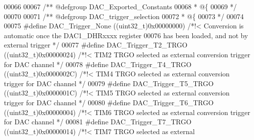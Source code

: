 \begin{DoxyCode}
00066 
00067 \textcolor{comment}{/** @defgroup DAC\_Exported\_Constants}
00068 \textcolor{comment}{  * @\{}
00069 \textcolor{comment}{  */}
00070 
00071 \textcolor{comment}{/** @defgroup DAC\_trigger\_selection }
00072 \textcolor{comment}{  * @\{}
00073 \textcolor{comment}{  */}
00074 
00075 \textcolor{preprocessor}{#}\textcolor{preprocessor}{define} \textcolor{preprocessor}{DAC\_Trigger\_None}                   \textcolor{preprocessor}{(}\textcolor{preprocessor}{(}\textcolor{preprocessor}{uint32\_t}\textcolor{preprocessor}{)}0x00000000\textcolor{preprocessor}{)} \textcolor{comment}{/*!< Conversion is automatic once
       the DAC1\_DHRxxxx register }
00076 \textcolor{comment}{                                                                       has been loaded, and not by
       external trigger */}
00077 \textcolor{preprocessor}{#}\textcolor{preprocessor}{define} \textcolor{preprocessor}{DAC\_Trigger\_T2\_TRGO}                \textcolor{preprocessor}{(}\textcolor{preprocessor}{(}\textcolor{preprocessor}{uint32\_t}\textcolor{preprocessor}{)}0x00000024\textcolor{preprocessor}{)} \textcolor{comment}{/*!< TIM2 TRGO selected as external
       conversion trigger for DAC channel */}
00078 \textcolor{preprocessor}{#}\textcolor{preprocessor}{define} \textcolor{preprocessor}{DAC\_Trigger\_T4\_TRGO}                \textcolor{preprocessor}{(}\textcolor{preprocessor}{(}\textcolor{preprocessor}{uint32\_t}\textcolor{preprocessor}{)}0x0000002C\textcolor{preprocessor}{)} \textcolor{comment}{/*!< TIM4 TRGO selected as external
       conversion trigger for DAC channel */}
00079 \textcolor{preprocessor}{#}\textcolor{preprocessor}{define} \textcolor{preprocessor}{DAC\_Trigger\_T5\_TRGO}                \textcolor{preprocessor}{(}\textcolor{preprocessor}{(}\textcolor{preprocessor}{uint32\_t}\textcolor{preprocessor}{)}0x0000001C\textcolor{preprocessor}{)} \textcolor{comment}{/*!< TIM5 TRGO selected as external
       conversion trigger for DAC channel */}
00080 \textcolor{preprocessor}{#}\textcolor{preprocessor}{define} \textcolor{preprocessor}{DAC\_Trigger\_T6\_TRGO}                \textcolor{preprocessor}{(}\textcolor{preprocessor}{(}\textcolor{preprocessor}{uint32\_t}\textcolor{preprocessor}{)}0x00000004\textcolor{preprocessor}{)} \textcolor{comment}{/*!< TIM6 TRGO selected as external
       conversion trigger for DAC channel */}
00081 \textcolor{preprocessor}{#}\textcolor{preprocessor}{define} \textcolor{preprocessor}{DAC\_Trigger\_T7\_TRGO}                \textcolor{preprocessor}{(}\textcolor{preprocessor}{(}\textcolor{preprocessor}{uint32\_t}\textcolor{preprocessor}{)}0x00000014\textcolor{preprocessor}{)} \textcolor{comment}{/*!< TIM7 TRGO selected as external
}
\end{DoxyCode}
